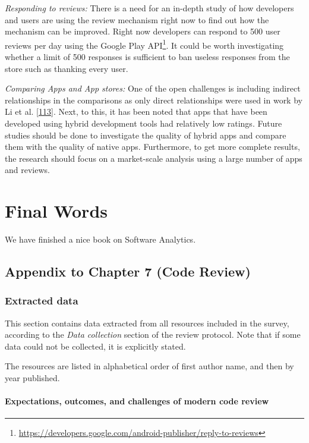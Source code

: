 \documentclass[]{book}
\let\rmarkdownfootnote\footnote%
\def\footnote{\protect\rmarkdownfootnote}
\begin{document}
\emph{Responding to reviews:} There is a need for an in-depth study of
how developers and users are using the review mechanism right now to
find out how the mechanism can be improved. Right now developers can
respond to 500 user reviews per day using the Google Play API\footnote{\url{https://developers.google.com/android-publisher/reply-to-reviews}}.
It could be worth investigating whether a limit of 500 responses is
sufficient to ban useless responses from the store such as thanking
every user.

\emph{Comparing Apps and App stores:} One of the open challenges is
including indirect relationships in the comparisons as only direct
relationships were used in work by Li et al.
{[}\protect\hyperlink{ref-li2017mining}{113}{]}. Next, to this, it has
been noted that apps that have been developed using hybrid development
tools had relatively low ratings. Future studies should be done to
investigate the quality of hybrid apps and compare them with the quality
of native apps. Furthermore, to get more complete results, the research
should focus on a market-scale analysis using a large number of apps and
reviews.

\chapter{Final Words}\label{final-words}

We have finished a nice book on Software Analytics.

\appendix


\section{Appendix to Chapter 7 (Code
Review)}\label{appendix-to-chapter-7-code-review}

\subsection{Extracted data}\label{extracted-data}

This section contains data extracted from all resources included in the
survey, according to the \emph{Data collection} section of the review
protocol. Note that if some data could not be collected, it is
explicitly stated.

The resources are listed in alphabetical order of first author name, and
then by year published.

\subsubsection{Expectations, outcomes, and challenges of modern code
review}\label{expectations-outcomes-and-challenges-of-modern-code-review}
\end{document}

